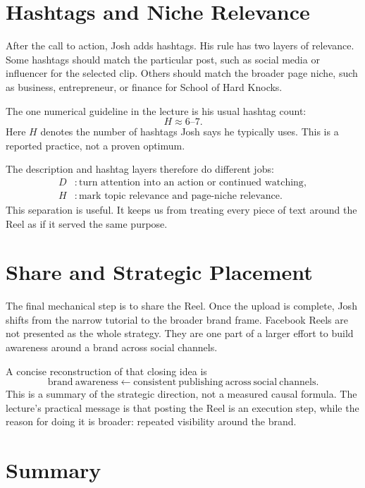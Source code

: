 \section{Hashtags and Niche Relevance}

After the call to action, Josh adds hashtags. His rule has two layers of relevance. Some hashtags should match the particular post, such as social media or influencer for the selected clip. Others should match the broader page niche, such as business, entrepreneur, or finance for School of Hard Knocks.

The one numerical guideline in the lecture is his usual hashtag count:
\begin{equation}
H \approx 6\text{--}7.
\end{equation}
Here \(H\) denotes the number of hashtags Josh says he typically uses. This is a reported practice, not a proven optimum.

The description and hashtag layers therefore do different jobs:
\begin{align}
D &: \text{turn attention into an action or continued watching}, \\
H &: \text{mark topic relevance and page-niche relevance}.
\end{align}
This separation is useful. It keeps us from treating every piece of text around the Reel as if it served the same purpose.

\section{Share and Strategic Placement}

The final mechanical step is to share the Reel. Once the upload is complete, Josh shifts from the narrow tutorial to the broader brand frame. Facebook Reels are not presented as the whole strategy. They are one part of a larger effort to build awareness around a brand across social channels.

A concise reconstruction of that closing idea is
\begin{equation}
\mathrm{brand\ awareness}
\leftarrow
\mathrm{consistent\ publishing\ across\ social\ channels}.
\end{equation}
This is a summary of the strategic direction, not a measured causal formula. The lecture's practical message is that posting the Reel is an execution step, while the reason for doing it is broader: repeated visibility around the brand.

\section{Summary}

